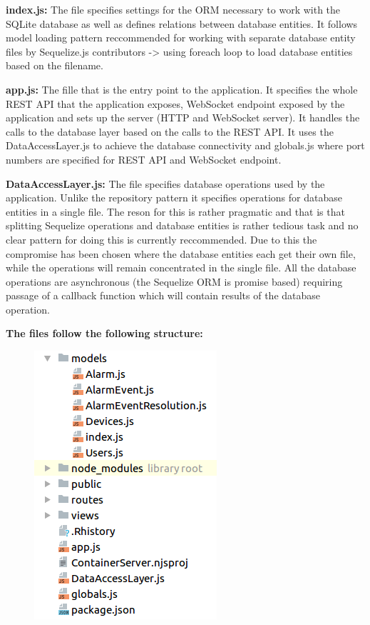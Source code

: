 \textbf{index.js:} \newline
The file specifies settings for the ORM necessary to work with the SQLite database as well as defines relations between database entities. It follows model loading pattern reccommended for working with separate database entity files by Sequelize.js contributors -> using foreach loop to load database entities based on the filename.

\smallskip
\textbf{app.js:} \newline
The fille that is the entry point to the application. It specifies the whole REST API that the application exposes, WebSocket endpoint exposed by the application and sets up the server (HTTP and WebSocket server). It handles the calls to the database layer based on the calls to the REST API. It uses the DataAccessLayer.js to achieve the database connectivity and globals.js where port numbers are specified for REST API and WebSocket endpoint.

\smallskip
\textbf{DataAccessLayer.js:} \newline
The file specifies database operations used by the application. Unlike the repository pattern it specifies operations for database entities in a single file. The reson for this is rather pragmatic and that is that splitting Sequelize operations and database entities is rather tedious task and no clear pattern for doing this is currently reccommended. Due to this the compromise has been chosen where the database entities each get their own file, while the operations will remain concentrated in the single file. All the database operations are asynchronous (the Sequelize ORM is promise based) requiring passage of a callback function which will contain results of the database operation.


\bigskip
\textbf{The files follow the following structure:}
\smallskip
\begin{figure}[H]
\includegraphics[scale=0.6]{gfx/structure}
\end{figure}
\smallskip


